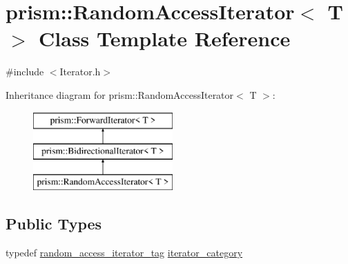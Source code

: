 \hypertarget{classprism_1_1_random_access_iterator}{}\section{prism\+:\+:Random\+Access\+Iterator$<$ T $>$ Class Template Reference}
\label{classprism_1_1_random_access_iterator}


{\ttfamily \#include $<$Iterator.\+h$>$}

Inheritance diagram for prism\+:\+:Random\+Access\+Iterator$<$ T $>$\+:\begin{figure}[H]
\begin{center}
\leavevmode
\includegraphics[height=3.000000cm]{classprism_1_1_random_access_iterator}
\end{center}
\end{figure}
\subsection*{Public Types}
\begin{DoxyCompactItemize}
\item 
typedef \hyperlink{structprism_1_1random__access__iterator__tag}{random\+\_\+access\+\_\+iterator\+\_\+tag} \hyperlink{classprism_1_1_random_access_iterator_a755002f950def606e79f492bda3dec59}{iterator\+\_\+category}
\end{DoxyCompactItemize}
